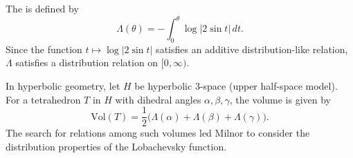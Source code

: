 The  is defined by
$$
\Lambda(\theta) = -\int_0^\theta \log |2 \sin t| \, dt.
$$
Since the function $t \mapsto \log|2 \sin t|$ satisfies an additive distribution-like relation, $\Lambda$ satisfies a distribution relation on $[0, \infty)$. 

In hyperbolic geometry, let $H$ be hyperbolic 3-space (upper half-space model). For a tetrahedron $T$ in $H$ with dihedral angles $\alpha, \beta, \gamma$, the volume is given by
$$
\text{Vol}(T) = \frac{1}{2}\bigl(\Lambda(\alpha) + \Lambda(\beta) + \Lambda(\gamma)\bigr).
$$
The search for relations among such volumes led Milnor to consider the distribution properties of the Lobachevsky function.
